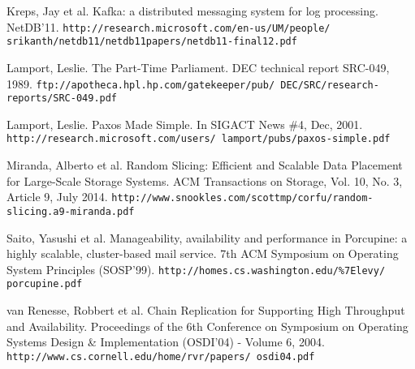 \documentclass[preprint,10pt]{sigplanconf}
\begin{document}
\begin{thebibliography}{}
Kreps, Jay et al.
Kafka: a distributed messaging system for log processing.
NetDB’11.
{\tt http://research.microsoft.com/en-us/UM/people/
  srikanth/netdb11/netdb11papers/netdb11-final12.pdf}

Lamport, Leslie.
The Part-Time Parliament.
DEC technical report SRC-049, 1989.
{\tt ftp://apotheca.hpl.hp.com/gatekeeper/pub/ DEC/SRC/research-reports/SRC-049.pdf}

Lamport, Leslie.
Paxos Made Simple.
In SIGACT News \#4, Dec, 2001.
{\tt http://research.microsoft.com/users/ lamport/pubs/paxos-simple.pdf}

Miranda, Alberto et al.
Random Slicing: Efficient and Scalable Data Placement for Large-Scale Storage Systems.
ACM Transactions on Storage, Vol. 10, No. 3, Article 9, July 2014.
{\tt http://www.snookles.com/scottmp/corfu/random- slicing.a9-miranda.pdf}

Saito, Yasushi et al.
Manageability, availability and performance in Porcupine: a highly scalable, cluster-based mail service.
7th ACM Symposium on Operating System Principles (SOSP’99).
{\tt http://homes.cs.washington.edu/\%7Elevy/ porcupine.pdf}

van Renesse, Robbert et al.
Chain Replication for Supporting High Throughput and Availability.
Proceedings of the 6th Conference on Symposium on Operating Systems
Design \& Implementation (OSDI'04) - Volume 6, 2004.
{\tt http://www.cs.cornell.edu/home/rvr/papers/ osdi04.pdf}

\end{thebibliography}
\end{document}
